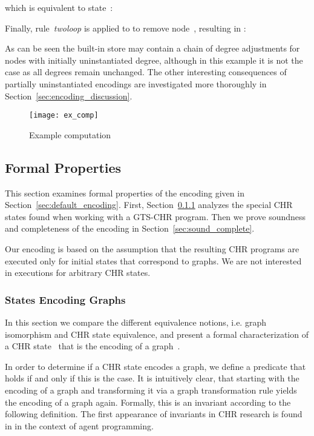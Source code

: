 \documentclass{tlp}
\begin{document}
which is equivalent to state~:



Finally, rule~\emph{twoloop} is applied to  to remove node~,
resulting in :



As can be seen the built-in store may contain a chain of degree adjustments for
nodes with initially uninstantiated degree, although in this example it is not
the case as all degrees remain unchanged. The other interesting consequences of
partially uninstantiated encodings are investigated more thoroughly in
Section~\ref{sec:encoding_discussion}.

\begin{figure}
\texttt{[image: ex\_comp]}
\caption{Example computation} 
\label{fig:ex_comp}
\end{figure}

\subsection{Formal Properties}
\label{sec:properties}

This section examines formal properties of the encoding given in
Section~\ref{sec:default_encoding}. First, Section~\ref{sec:graph_states}
analyzes the special CHR states found when working with a GTS-CHR program. Then
we prove soundness and completeness of the encoding in
Section~\ref{sec:sound_complete}.

Our encoding is based on the assumption that the resulting CHR programs are
executed only for initial states that correspond to graphs. We are not interested
in executions for arbitrary CHR states.

\subsubsection{States Encoding Graphs}
\label{sec:graph_states}

In this section we compare the different equivalence notions, i.e. graph
isomorphism and CHR state equivalence, and present a formal characterization of a
CHR state~ that is the encoding of a graph~.

In order to determine if a CHR state encodes a graph, we define a predicate that
holds if and only if this is the case. It is intuitively clear, that starting
with the encoding of a graph and transforming it via a graph transformation rule
yields the encoding of a graph again. Formally, this is an invariant according to
the following definition. The first appearance of invariants in CHR research is
found in \cite{lam_sulz_linear_logic_agents_chr06} in the context of agent
programming.
\end{document}

